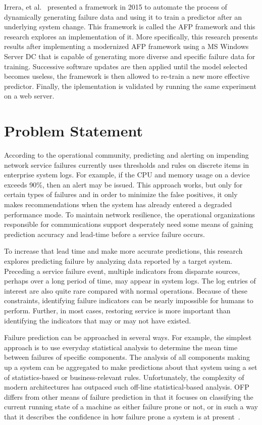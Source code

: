 Irrera, et al.~\cite{irrera2015} presented a framework in 2015 to automate the
process of dynamically generating failure data and using it to train a
predictor after an underlying system change.  This framework is called the
\ac{AFP} framework and this research explores an implementation of it.  More
specifically, this research presents results after implementing a modernized
\ac{AFP} framework using a \ac{MS} Windows Server \ac{DC} that is capable of
generating more diverse and specific failure data for training.  Successive
software updates are then applied until the model selected becomes useless, the
framework is then allowed to re-train a new more effective predictor.  Finally,
the iplementation is validated by running the same experiment on a web server.

\section{Problem Statement}
According to the operational community, predicting and alerting on impending
network service failures currently uses thresholds and rules on discrete items
in enterprise system logs.  For example, if the \ac{CPU} and memory usage on a
device exceeds 90\%, then an alert may be issued.  This approach works, but
only for certain types of failures and in order to minimize the false
positives, it only makes recommendations when the system has already entered a
degraded performance mode.  To maintain network resilience, the operational
organizations responsible for communications support desperately need some
means of gaining prediction accuracy and lead-time before a service failure
occurs.  

To increase that lead time and make more accurate predictions, this research
explores predicting failure by analyzing data reported by a target system.
Preceding a service failure event, multiple indicators from disparate sources,
perhaps over a long period of time, may appear in system logs.  The log entries
of interest are also quite rare compared with normal operations.  Because of
these constraints, identifying failure indicators can be nearly impossible for
humans to perform.  Further, in most cases, restoring service is more important
than identifying the indicators that may or may not have existed.  

Failure prediction can be approached in several ways. For example, the simplest
approach is to use everyday statistical analysis to determine the mean time
between failures of specific components. The analysis of all components making
up a system can be aggregated to make predictions about that system using a set
of statistics-based or business-relevant rules.  Unfortunately, the complexity
of modern architectures has outpaced such off-line statistical-based analysis.
\ac{OFP} differs from other means of failure prediction in that it focuses on
classifying the current running state of a machine as either failure prone or
not, or in such a way that it describes the confidence in how failure prone a
system is at present~\cite{salfnerSurvey}.

